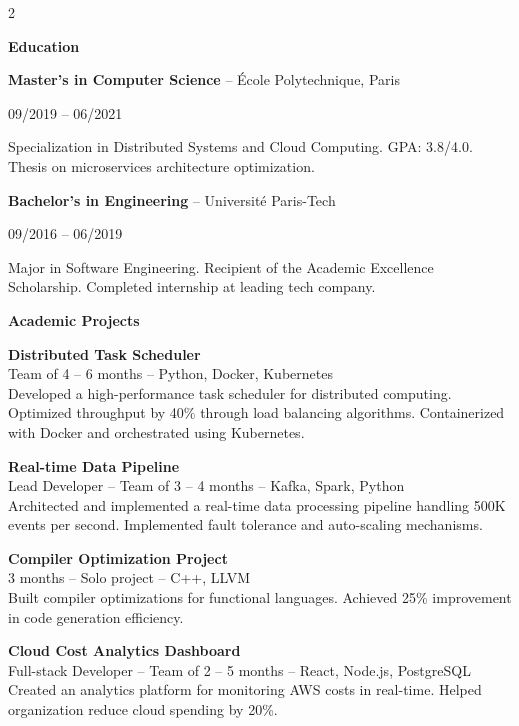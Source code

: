\documentclass[a4paper,10pt]{article}
\newcommand{\cvsection}[1]{%
    \vspace{1.2em}
    {\color{primary}\large\bfseries #1}
    \vspace{0.6em}
    \par
}
\newcommand{\cvsubsection}[2]{%
    \textbf{#1} {\color{primary}-- #2}
    \par
}
\newcommand{\cvdate}[1]{%
    {\color{lightgray}\small #1}
    \par
}
\newcommand{\cvdesc}[1]{%
    {\color{darkgray}\small #1}
    \par
}
\begin{document}
\setlength{\columnsep}{1.5em}
\begin{paracol}{2}


\cvsection{Education}

\cvsubsection{Master's in Computer Science}{École Polytechnique, Paris}
\cvdate{09/2019 -- 06/2021}
\cvdesc{Specialization in Distributed Systems and Cloud Computing. GPA: 3.8/4.0. Thesis on microservices architecture optimization.}

\vspace{0.8em}
\cvsubsection{Bachelor's in Engineering}{Université Paris-Tech}
\cvdate{09/2016 -- 06/2019}
\cvdesc{Major in Software Engineering. Recipient of the Academic Excellence Scholarship. Completed internship at leading tech company.}

\cvsection{Academic Projects}

\textbf{Distributed Task Scheduler}\\
\cvdesc{Team of 4 -- 6 months -- Python, Docker, Kubernetes\\
Developed a high-performance task scheduler for distributed computing. Optimized throughput by 40\% through load balancing algorithms. Containerized with Docker and orchestrated using Kubernetes.}

\vspace{0.8em}
\textbf{Real-time Data Pipeline}\\
\cvdesc{Lead Developer -- Team of 3 -- 4 months -- Kafka, Spark, Python\\
Architected and implemented a real-time data processing pipeline handling 500K events per second. Implemented fault tolerance and auto-scaling mechanisms.}

\vspace{0.8em}
\textbf{Compiler Optimization Project}\\
\cvdesc{3 months -- Solo project -- C++, LLVM\\
Built compiler optimizations for functional languages. Achieved 25\% improvement in code generation efficiency.}

\vspace{0.8em}
\textbf{Cloud Cost Analytics Dashboard}\\
\cvdesc{Full-stack Developer -- Team of 2 -- 5 months -- React, Node.js, PostgreSQL\\
Created an analytics platform for monitoring AWS costs in real-time. Helped organization reduce cloud spending by 20\%.}


\end{paracol}
\end{document}
